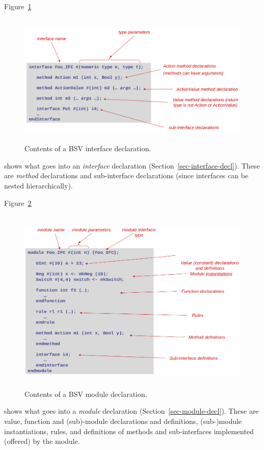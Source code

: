 \documentclass[twoside,letterpaper]{article}
\newcommand{\BSV}{BSV}
\begin{document}
Figure~\ref{fig_Contents_Interface_Decl}
\begin{figure}[htbp]
    \centerline{\includegraphics[height=2.5in]{Figures/fig_Contents_Interface_Decl}}
    \caption{%
        \label{fig_Contents_Interface_Decl}
        Contents of a {\BSV} interface declaration.
    }
\end{figure}
shows what goes into an \emph{interface} declaration
(Section~\ref{sec-interface-decl}).  These are \emph{method}
declarations and sub-interface declarations (since interfaces can be
nested hierarchically).

Figure~\ref{fig_Contents_Module_Decl}
\begin{figure}[htbp]
    \centerline{\includegraphics[height=3.5in]{Figures/fig_Contents_Module_Decl}}
    \caption{%
        \label{fig_Contents_Module_Decl}
        Contents of a {\BSV} module declaration.
    }
\end{figure}
shows what goes into a \emph{module} declaration
(Section~\ref{sec-module-decl}).  These are value, function and
(sub)-module declarations and definitions, (sub-)module
instantiations, rules, and definitions of methods and sub-interfaces
implemented (offered) by the module.
\end{document}
